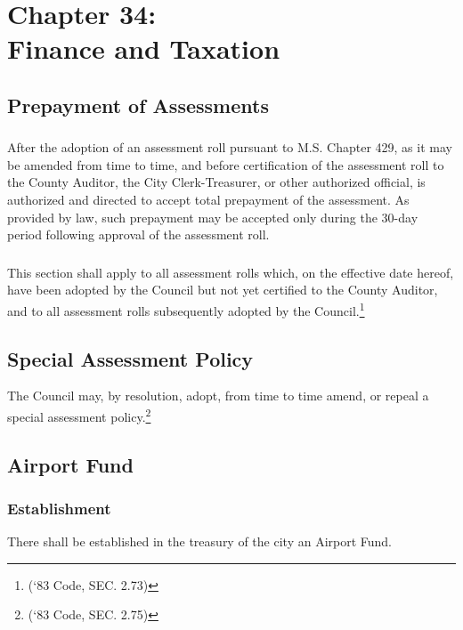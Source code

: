 \chapter*{Chapter 34: \\
	Finance and Taxation}
    \minitoc
    \pagebreak
    
\section{Prepayment of Assessments}
\subsection{}
After the adoption of an assessment roll pursuant to M.S. Chapter 429, as it may be amended from time to time, and before certification of the assessment roll to the County Auditor, the City Clerk-Treasurer, or other authorized official, is authorized and directed to accept total prepayment of the assessment.  As provided by law, such prepayment may be accepted only during the 30-day period following approval of the assessment roll.
\subsection{}
This section shall apply to all assessment rolls which, on the effective date hereof, have been adopted by the Council but not yet certified to the County Auditor, and to all assessment rolls subsequently adopted by the Council.\footnote{(‘83 Code, SEC. 2.73)}

\section{Special Assessment Policy}
The Council may, by resolution, adopt, from time to time amend, or repeal a special assessment policy.\footnote{(‘83 Code, SEC. 2.75)}

\section{Airport Fund}
\subsection{Establishment}
There shall be established in the treasury of the city an Airport Fund.
